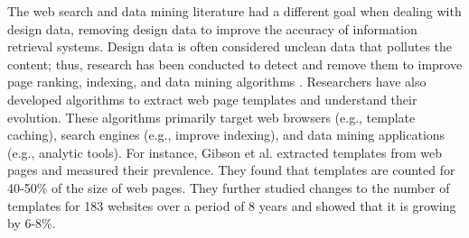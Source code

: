 The web search and data mining literature had a different goal when dealing with design data, removing design data to improve the accuracy of information retrieval systems.
Design data is often considered unclean data that pollutes the content; thus, research has been conducted to detect and remove them to improve page ranking, indexing, and data mining algorithms \cite{bar_2002_WWW, gibson_2005_WWW, chakrabarti_2007_WWW}. 
Researchers have also developed algorithms to extract web page templates and understand their evolution.
These algorithms primarily target web browsers (e.g., template caching), search engines (e.g., improve indexing), and data mining applications (e.g., analytic tools).
For instance, Gibson et al. \cite{gibson_2005_WWW} extracted templates from web pages and measured their prevalence.
They found that templates are counted for 40-50\% of the size of web pages.
They further studied changes to the number of templates for 183 websites over a period of 8 years and showed that it is growing by 6-8\%.